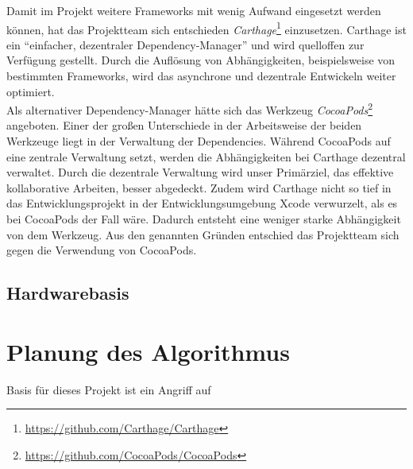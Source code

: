 Damit im Projekt weitere Frameworks mit wenig Aufwand eingesetzt werden können, hat das Projektteam sich entschieden \emph{Carthage}\footnote{\url{https://github.com/Carthage/Carthage}} einzusetzen. Carthage ist ein \enquote{einfacher, dezentraler Dependency-Manager} und wird quelloffen zur Verfügung gestellt. Durch die Auflösung von Abhängigkeiten, beispielsweise von bestimmten Frameworks, wird das asynchrone und dezentrale Entwickeln weiter optimiert. \\
Als alternativer Dependency-Manager hätte sich das Werkzeug \emph{CocoaPods}\footnote{\url{https://github.com/CocoaPods/CocoaPods}} angeboten. Einer der großen Unterschiede in der Arbeitsweise der beiden Werkzeuge liegt in der Verwaltung der Dependencies. Während CocoaPods auf eine zentrale Verwaltung setzt, werden die Abhängigkeiten bei Carthage dezentral verwaltet. Durch die dezentrale Verwaltung wird unser Primärziel, das effektive kollaborative Arbeiten, besser abgedeckt. Zudem wird Carthage nicht so tief in das Entwicklungsprojekt in der Entwicklungsumgebung Xcode verwurzelt, als es bei CocoaPods der Fall wäre. Dadurch entsteht eine weniger starke Abhängigkeit von dem Werkzeug. Aus den genannten Gründen entschied das Projektteam sich gegen die Verwendung von CocoaPods. 

\subsection{Hardwarebasis}

\section{Planung des Algorithmus}
\label{ideeBruteForce}
Basis für dieses Projekt ist ein Angriff auf 


